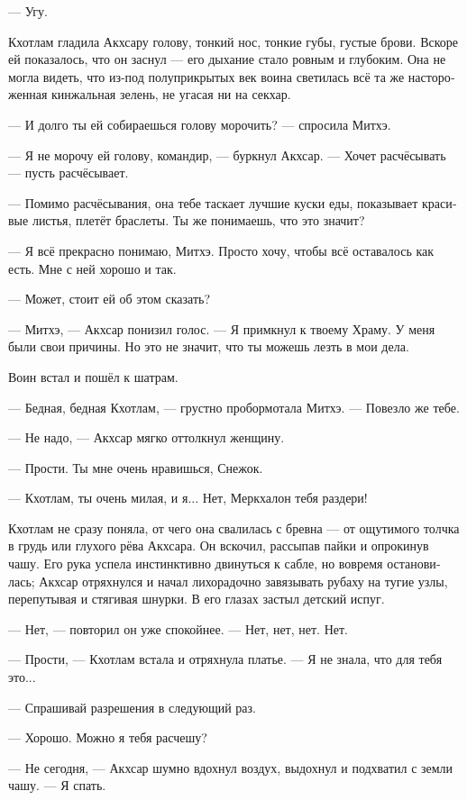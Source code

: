 \documentclass[a4paper,12pt,fleqn]{book}\usepackage{cooltooltips}\usepackage{polyglossia}\setdefaultlanguage[babelshorthands=true]{russian}\setotherlanguage{english}\defaultfontfeatures{Ligatures=TeX,Mapping=tex-text} \usepackage{xcolor}\definecolor{lightgray}{HTML}{bbbbbb}\color{lightgray}\newcommand{\ml}[3]{\textenglish{\textcolor{black}{#3}} }
\newcommand{\asterism}{\vspace{1em}{\centering\Large\bfseries$\ast~\ast~\ast$\par}\vspace{1em}}
\begin{document}
--- Угу.

Кхотлам гладила Акхсару голову, тонкий нос, тонкие губы, густые брови.
Вскоре ей показалось, что он заснул --- его дыхание стало ровным и глубоким.
Она не могла видеть, что из-под полуприкрытых век воина светилась всё та же настороженная кинжальная зелень, не угасая ни на секхар.

\asterism

--- И долго ты ей собираешься голову морочить? --- спросила Митхэ.

--- Я не морочу ей голову, командир, --- буркнул Акхсар.
--- Хочет расчёсывать --- пусть расчёсывает.

--- Помимо расчёсывания, она тебе таскает лучшие куски еды, показывает красивые листья, плетёт браслеты.
Ты же понимаешь, что это значит?

--- Я всё прекрасно понимаю, Митхэ.
Просто хочу, чтобы всё оставалось как есть.
Мне с ней хорошо и так.

--- Может, стоит ей об этом сказать?

--- Митхэ, --- Акхсар понизил голос.
--- Я примкнул к твоему Храму.
У меня были свои причины.
Но это не значит, что ты можешь лезть в мои дела.

Воин встал и пошёл к шатрам.

--- Бедная, бедная Кхотлам, --- грустно пробормотала Митхэ.
--- Повезло же тебе.

\asterism

--- Не надо, --- Акхсар мягко оттолкнул женщину.

--- Прости.
Ты мне очень нравишься, Снежок.

--- Кхотлам, ты очень милая, и я...
Нет, Меркхалон тебя раздери!

Кхотлам не сразу поняла, от чего она свалилась с бревна --- от ощутимого толчка в грудь или глухого рёва Акхсара.
Он вскочил, рассыпав пайки и опрокинув чашу.
Его рука успела инстинктивно двинуться к сабле, но вовремя остановилась;
Акхсар отряхнулся и начал лихорадочно завязывать рубаху на тугие узлы, перепутывая и стягивая шнурки.
В его глазах застыл детский испуг.

--- Нет, --- повторил он уже спокойнее.
--- Нет, нет, нет.
Нет.

--- Прости, --- Кхотлам встала и отряхнула платье.
--- Я не знала, что для тебя это...

--- Спрашивай разрешения в следующий раз.

--- Хорошо.
Можно я тебя расчешу?

--- Не сегодня, --- Акхсар шумно вдохнул воздух, выдохнул и подхватил с земли чашу.
--- Я спать.
\end{document}
